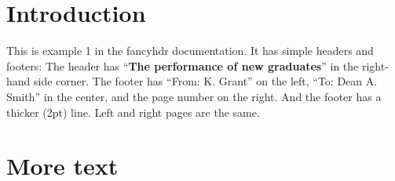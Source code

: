 \documentclass{article}
\begin{document}
\section{Introduction}

\begin{boxedminipage}{\textwidth}
This is example 1 in the fancyhdr documentation. It has simple headers and footers:
The header has {``\textbf{The performance of new graduates}''} in the right-hand side corner.
The footer has ``From: K. Grant'' on the left, ``To: Dean A. Smith'' in the center, and the page number on the right. And the footer has a thicker (2pt) line. Left and right pages are the same.
\end{boxedminipage}


\section{More text}

\lipsum
\end{document}
